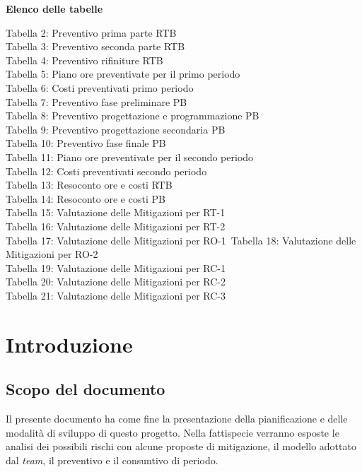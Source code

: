 \documentclass[5pt]{article}
\begin{document}
\begin{flushleft}
	\textbf{\Large Elenco delle tabelle}
	\begin{spacing}{1.5}
		Tabella 2: Preventivo prima parte RTB \\
		Tabella 3: Preventivo seconda parte RTB \\
		Tabella 4: Preventivo rifiniture RTB \\
		Tabella 5: Piano ore preventivate per il primo periodo \\
		Tabella 6: Costi preventivati primo periodo \\
		Tabella 7: Preventivo fase preliminare PB \\
		Tabella 8: Preventivo progettazione e programmazione PB \\
		Tabella 9: Preventivo progettazione secondaria PB \\
		Tabella 10: Preventivo fase finale PB \\
		Tabella 11: Piano ore preventivate per il secondo periodo \\
		Tabella 12: Costi preventivati secondo periodo \\
		Tabella 13: Resoconto ore e costi RTB \\
            Tabella 14: Resoconto ore e costi PB \\
            Tabella 15: Valutazione delle Mitigazioni per RT-1\\
            Tabella 16: Valutazione delle Mitigazioni per RT-2\\
            Tabella 17: Valutazione delle Mitigazioni per RO-1\
            Tabella 18: Valutazione delle Mitigazioni per RO-2\\
            Tabella 19: Valutazione delle Mitigazioni per RC-1\\
            Tabella 20: Valutazione delle Mitigazioni per RC-2\\
            Tabella 21: Valutazione delle Mitigazioni per RC-3\\
	\end{spacing}
\end{flushleft}

\pagebreak

\section{Introduzione}
  \subsection{Scopo del documento}
    Il presente documento ha come fine la presentazione della pianificazione e delle modalità di sviluppo di questo progetto. 
    Nella fattispecie verranno esposte le analisi dei possibili rischi con alcune proposte di mitigazione, il modello adottato dal \textit{team}, 
    il preventivo e il consuntivo di periodo.
\end{document}
